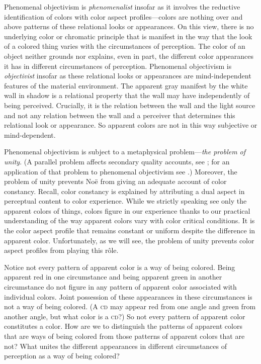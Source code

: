\documentclass[12pt]{article}
\begin{document}
Phenomenal objectivism is \emph{phenomenalist} insofar as it involves the reductive identification of colors with color aspect profiles---colors are nothing over and above patterns of these relational looks or appearances. On this view, there is no underlying color or chromatic principle that is manifest in the way that the look of a colored thing varies with the circumstances of perception. The color of an object neither grounds nor explains, even in part, the different color appearances it has in different circumstances of perception. Phenomenal objectivism is \emph{objectivist} insofar as these relational looks or appearances are mind-independent features of the material environment. The apparent gray manifest by the white wall in shadow is a relational property that the wall may have independently of being perceived. Crucially, it is the relation between the wall and the light source and not any relation between the wall and a perceiver that determines this relational look or appearance. So apparent colors are not in this way subjective or mind-dependent.

Phenomenal objectivism is subject to a metaphysical problem---\emph{the problem of unity}. (A parallel problem affects secondary quality accounts, see \citealt{Kalderon:2008fk}; for an application of that problem to phenomenal objectivism see \citealt{Allen:2008kx}.) Moreover, the problem of unity prevents Noë from giving an adequate account of color constancy. Recall, color constancy is explained by attributing a dual aspect in perceptual content to color experience. While we strictly speaking see only the apparent colors of things, colors figure in our experience thanks to our practical understanding of the way apparent colors vary with color critical conditions. It is the color aspect profile that remains constant or uniform despite the difference in apparent color. Unfortunately, as we will see, the problem of unity prevents color aspect profiles from playing this rôle.

Notice not every pattern of apparent color is a way of being colored. Being apparent red in one circumstance and being apparent green in another circumstance do not figure in any pattern of apparent color associated with individual colors. Joint possession of these appearances in these circumstances is not a way of being colored. (A \textsc{cd} may appear red from one angle and green from another angle, but what color is a \textsc{cd}?) So not every pattern of apparent color constitutes a color. How are we to distinguish the patterns of apparent colors that are ways of being colored from those patterns of apparent colors that are not? What unites the different appearances in different circumstances of perception as a way of being colored?
\end{document}
